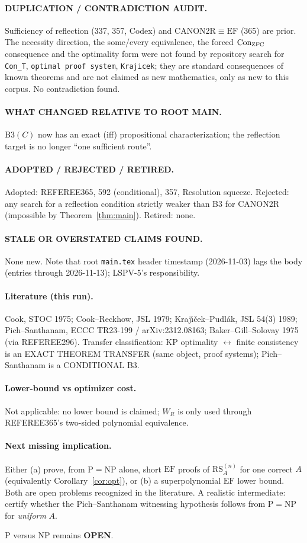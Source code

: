 \documentclass[11pt]{article}
\newcommand{\EF}{\mathrm{EF}}
\newcommand{\RS}{\mathrm{RS}}
\begin{document}
\paragraph{DUPLICATION / CONTRADICTION AUDIT.} Sufficiency of reflection (337, 357, Codex) and
CANON2R$\equiv\EF$ (365) are prior. The necessity direction, the some/every equivalence, the forced
$\mathrm{Con}_{\rm ZFC}$ consequence and the optimality form were not found by repository search for
\texttt{Con\_T}, \texttt{optimal proof system}, \texttt{Krajicek}; they are standard consequences of
known theorems and are not claimed as new mathematics, only as new to this corpus. No contradiction found.
\paragraph{WHAT CHANGED RELATIVE TO ROOT MAIN.} B3$(C)$ now has an exact (iff) propositional
characterization; the reflection target is no longer ``one sufficient route''.
\paragraph{ADOPTED / REJECTED / RETIRED.} Adopted: REFEREE365, 592 (conditional), 357, Resolution squeeze.
Rejected: any search for a reflection condition strictly weaker than B3 for CANON2R (impossible by
Theorem~\ref{thm:main}). Retired: none.
\paragraph{STALE OR OVERSTATED CLAIMS FOUND.} None new. Note that root \texttt{main.tex} header timestamp
(2026-11-03) lags the body (entries through 2026-11-13); LSPV-5's responsibility.
\paragraph{Literature (this run).} Cook, STOC 1975; Cook--Reckhow, JSL 1979; Kraj\'{\i}\v{c}ek--Pudl\'ak,
JSL 54(3) 1989; Pich--Santhanam, ECCC TR23-199 / arXiv:2312.08163; Baker--Gill--Solovay 1975 (via REFEREE296).
Transfer classification: KP optimality $\leftrightarrow$ finite consistency is an
EXACT THEOREM TRANSFER (same object, proof systems); Pich--Santhanam is a CONDITIONAL B3.
\paragraph{Lower-bound vs optimizer cost.} Not applicable: no lower bound is claimed; $W_R$ is only used
through REFEREE365's two-sided polynomial equivalence.
\paragraph{Next missing implication.} Either (a) prove, from P$=$NP alone, short $\EF$ proofs of
$\RS_A^{(n)}$ for one correct $A$ (equivalently Corollary~\ref{cor:opt}), or (b) a superpolynomial
$\EF$ lower bound. Both are open problems recognized in the literature. A realistic intermediate:
certify whether the Pich--Santhanam witnessing hypothesis follows from P$=$NP for \emph{uniform} $A$.

\bigskip\noindent P versus NP remains \textbf{OPEN}.
\end{document}

